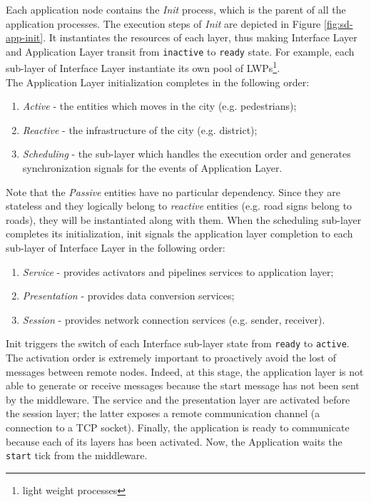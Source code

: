 Each application node contains the \textit{Init} process,
which is the parent of all the application processes.
The execution steps of \textit{Init} are depicted in Figure
\ref{fig:sd-app-init}.
It instantiates the resources of each layer, thus making
Interface Layer and Application Layer transit from \verb|inactive|
to \verb|ready| state.
For example, each sub-layer of Interface Layer instantiate its own pool of
LWPs\footnote{light weight processes}.
\\
The Application Layer initialization completes in the following order:
\begin{enumerate}
	\item \textit{Active} - the entities which moves in the city
	(e.g. pedestrians);
	\item \textit{Reactive} - the infrastructure of the city (e.g. district);
	\item \textit{Scheduling} - the sub-layer which handles the execution order
	and generates synchronization signals for the events of Application Layer.
\end{enumerate}
Note that the \textit{Passive} entities have no particular dependency. Since
they are stateless and they logically belong to \textit{reactive} entities
(e.g. road signs belong to roads), they will be instantiated along with them.
When the scheduling sub-layer completes its initialization, init signals
the application layer completion to each sub-layer of Interface Layer in the
following order:
\begin{enumerate}
	\item \textit{Service} - provides activators and pipelines services to
	application layer;
	\item \textit{Presentation} - provides data conversion services;
	\item \textit{Session} - provides network connection services
	(e.g. sender, receiver).
\end{enumerate}
Init triggers the switch of each Interface sub-layer state from
\verb|ready| to \verb|active|.
The activation order is extremely important to
proactively avoid the lost of messages between remote nodes. Indeed, at this
stage, the application layer is not able to generate or receive messages
because the start message has not been sent by the middleware.
The service and
the presentation layer are activated before the session layer; the latter
exposes a remote communication channel (a connection to a TCP socket).
Finally, the application is ready to communicate because each of its layers
has been activated. Now, the Application waits the \verb|start| tick from the
middleware.

